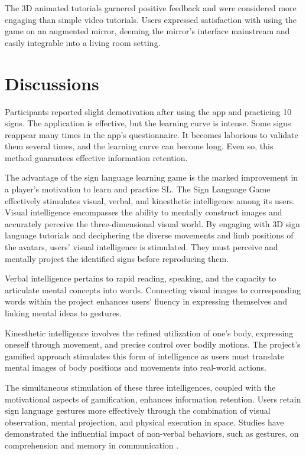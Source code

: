The 3D animated tutorials garnered positive feedback and were considered more engaging than simple video tutorials. Users expressed satisfaction with using the game on an augmented mirror, deeming the mirror's interface mainstream and easily integrable into a living room setting.


\section{Discussions}

Participants reported slight demotivation after using the app and practicing 10 signs. The application is effective, but the learning curve is intense. Some signs reappear many times in the app's questionnaire. It becomes laborious to validate them several times, and the learning curve can become long. Even so, this method guarantees effective information retention.

The advantage of the sign language learning game is the marked improvement in a player's motivation to learn and practice SL.
The Sign Language Game effectively stimulates visual, verbal, and kinesthetic intelligence among its users. Visual intelligence encompasses the ability to mentally construct images and accurately perceive the three-dimensional visual world. By engaging with 3D sign language tutorials and deciphering the diverse movements and limb positions of the avatars, users' visual intelligence is stimulated. They must perceive and mentally project the identified signs before reproducing them.

Verbal intelligence pertains to rapid reading, speaking, and the capacity to articulate mental concepts into words. Connecting visual images to corresponding words within the project enhances users' fluency in expressing themselves and linking mental ideas to gestures.

Kinesthetic intelligence involves the refined utilization of one's body, expressing oneself through movement, and precise control over bodily motions. The project's gamified approach stimulates this form of intelligence as users must translate mental images of body positions and movements into real-world actions.

The simultaneous stimulation of these three intelligences, coupled with the motivational aspects of gamification, enhances information retention. Users retain sign language gestures more effectively through the combination of visual observation, mental projection, and physical execution in space. Studies have demonstrated the influential impact of non-verbal behaviors, such as gestures, on comprehension and memory in communication \cite{kelly1999offering}.


